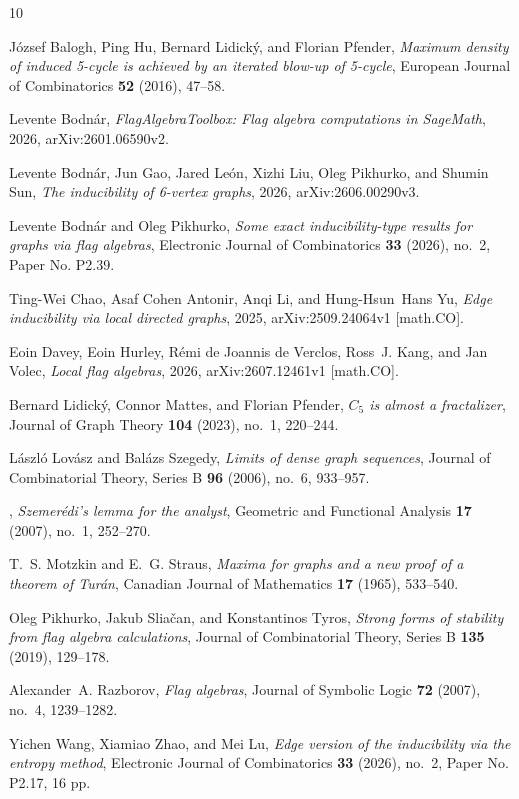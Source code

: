 \documentclass[11pt]{amsart}
\theoremstyle{definition}
\theoremstyle{remark}
\begin{document}
\begin{thebibliography}{10}

J{\'o}zsef Balogh, Ping Hu, Bernard Lidick{\'y}, and Florian Pfender,
  \emph{Maximum density of induced 5-cycle is achieved by an iterated blow-up
  of 5-cycle}, European Journal of Combinatorics \textbf{52} (2016), 47--58.

Levente Bodn{\'a}r, \emph{{FlagAlgebraToolbox}: Flag algebra computations in
  {SageMath}}, 2026, arXiv:2601.06590v2.

Levente Bodn{\'a}r, Jun Gao, Jared Le{\'o}n, Xizhi Liu, Oleg Pikhurko, and
  Shumin Sun, \emph{The inducibility of 6-vertex graphs}, 2026,
  arXiv:2606.00290v3.

Levente Bodn{\'a}r and Oleg Pikhurko, \emph{Some exact inducibility-type
  results for graphs via flag algebras}, Electronic Journal of Combinatorics
  \textbf{33} (2026), no.~2, Paper No. P2.39.

Ting-Wei Chao, Asaf {Cohen Antonir}, Anqi Li, and Hung-Hsun~Hans Yu, \emph{Edge
  inducibility via local directed graphs}, 2025, arXiv:2509.24064v1 [math.CO].

Eoin Davey, Eoin Hurley, R{\'e}mi {de Joannis de Verclos}, Ross~J. Kang, and
  Jan Volec, \emph{Local flag algebras}, 2026, arXiv:2607.12461v1 [math.CO].

Bernard Lidick{\'y}, Connor Mattes, and Florian Pfender, \emph{{$C_5$} is
  almost a fractalizer}, Journal of Graph Theory \textbf{104} (2023), no.~1,
  220--244.

L{\'a}szl{\'o} Lov{\'a}sz and Bal{\'a}zs Szegedy, \emph{Limits of dense graph
  sequences}, Journal of Combinatorial Theory, Series B \textbf{96} (2006),
  no.~6, 933--957.

\bysame, \emph{Szemer{\'e}di's lemma for the analyst}, Geometric and Functional
  Analysis \textbf{17} (2007), no.~1, 252--270.

T.~S. Motzkin and E.~G. Straus, \emph{Maxima for graphs and a new proof of a
  theorem of {Tur{\'a}n}}, Canadian Journal of Mathematics \textbf{17} (1965),
  533--540.

Oleg Pikhurko, Jakub Slia{\v c}an, and Konstantinos Tyros, \emph{Strong forms
  of stability from flag algebra calculations}, Journal of Combinatorial
  Theory, Series B \textbf{135} (2019), 129--178.

Alexander~A. Razborov, \emph{Flag algebras}, Journal of Symbolic Logic
  \textbf{72} (2007), no.~4, 1239--1282.

Yichen Wang, Xiamiao Zhao, and Mei Lu, \emph{Edge version of the inducibility
  via the entropy method}, Electronic Journal of Combinatorics \textbf{33}
  (2026), no.~2, Paper No. P2.17, 16 pp.

\end{thebibliography}
\end{document}

